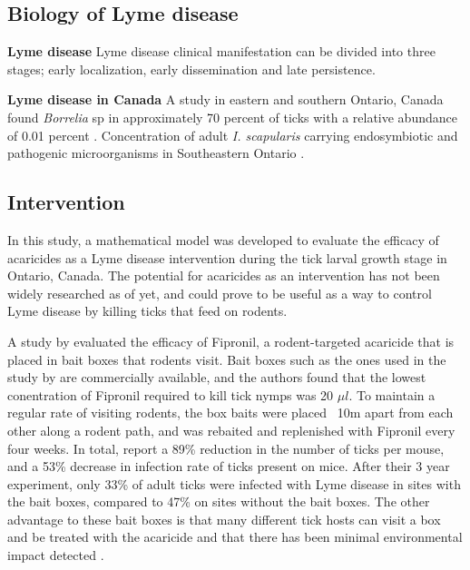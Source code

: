 \documentclass[12pt, centerh1]{article}
\begin{document}
\subsection{Biology of Lyme disease}

\textbf{Lyme disease}
Lyme disease clinical manifestation can be divided into three stages; early localization, early dissemination and late persistence. 

\textbf{Lyme disease in Canada}
A study in eastern and southern Ontario, Canada found \textit{Borrelia} sp in approximately 70 percent of ticks with a relative abundance of 0.01 percent \citep{clow2018microbiota}. Concentration of adult \textit{I. scapularis} carrying endosymbiotic and pathogenic microorganisms in Southeastern Ontario \citep{paulson2023multiomics}. 


\subsection{Intervention}

In this study, a mathematical model was developed to evaluate the efficacy of acaricides as a Lyme disease intervention during the tick larval growth stage in Ontario, Canada. The potential for acaricides as an intervention has not been widely researched as of yet, and could prove to be useful as a way to control Lyme disease by killing ticks that feed on rodents. 

A study by \citet{dolan2004control} evaluated the efficacy of Fipronil, a rodent-targeted acaricide that is placed in bait boxes that rodents visit. Bait boxes such as the ones used in the study by \citet{dolan2004control} are commercially available, and the authors found that the lowest conentration of Fipronil required to kill tick nymps was 20 $\mu l$. To maintain a regular rate of visiting rodents, the box baits were placed ~10m apart from each other along a rodent path, and was rebaited and replenished with Fipronil every four weeks. In total, \citet{dolan2004control} report a 89\% reduction in the number of ticks per mouse, and a 53\% decrease in infection rate of ticks present on mice. After their 3 year experiment, only 33\% of adult ticks were infected with Lyme disease in sites with the bait boxes, compared to 47\% on sites without the bait boxes. The other advantage to these bait boxes is that many different tick hosts can visit a box and be treated with the acaricide and that there has been minimal environmental impact detected \citep{dolan2004control}. 
\end{document}
